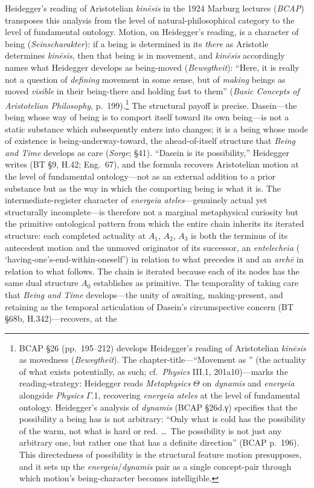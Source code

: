 Heidegger's reading of Aristotelian \textit{kinēsis} in the 1924 Marburg lectures (\textit{BCAP}) transposes this analysis from the level of natural-philosophical category to the level of fundamental ontology. Motion, on Heidegger's reading, is a character of being (\textit{Seinscharakter}): if a being is determined in its \textit{there} as Aristotle determines \textit{kinēsis}, then that being is in movement, and \textit{kinēsis} accordingly names what Heidegger develops as being-moved (\textit{Bewegtheit}): ``Here, it is really not a question of \textit{defining} movement in some sense, but of \textit{making} beings as moved \textit{visible} in their being-there and holding fast to them'' (\textit{Basic Concepts of Aristotelian Philosophy}, p.~199).\footnote{BCAP §26 (pp.~195--212) develops Heidegger's reading of Aristotelian \textit{kinēsis} as movedness (\textit{Bewegtheit}). The chapter-title---``Movement as '' (the actuality of what exists potentially, as such; cf.~\textit{Physics} III.1, 201a10)---marks the reading-strategy: Heidegger reads \textit{Metaphysics} $\Theta$ on \textit{dynamis} and \textit{energeia} alongside \textit{Physics} $\Gamma$.1, recovering \textit{energeia ateles} at the level of fundamental ontology. Heidegger's analysis of \textit{dynamis} (BCAP §26d.γ) specifies that the possibility a being has is not arbitrary: ``Only what is cold has the possibility of the warm, not what is hard or red. \ldots\ The possibility is not just any arbitrary one, but rather one that has a definite direction'' (BCAP p.~196). This directedness of possibility is the structural feature motion presupposes, and it sets up the \textit{energeia}/\textit{dynamis} pair as a single concept-pair through which motion's being-character becomes intelligible.} The structural payoff is precise. Dasein---the being whose way of being is to comport itself toward its own being---is not a static substance which subsequently enters into changes; it is a being whose mode of existence is being-underway-toward, the ahead-of-itself structure that \textit{Being and Time} develops as care (\textit{Sorge}; \S 41). ``Dasein is its possibility,'' Heidegger writes (BT \S 9, H.42; Eng.~67), and the formula recovers Aristotelian motion at the level of fundamental ontology---not as an external addition to a prior substance but as the way in which the comporting being is what it is. The intermediate-register character of \textit{energeia ateles}---genuinely actual yet structurally incomplete---is therefore not a marginal metaphysical curiosity but the primitive ontological pattern from which the entire chain inherits its iterated structure: each completed actuality at $A_1$, $A_2$, $A_3$ is both the terminus of its antecedent motion and the unmoved originator of its successor, an \textit{entelecheia} ( `having-one's-end-within-oneself') in relation to what precedes it and an \textit{archē} in relation to what follows. The chain is iterated because each of its nodes has the same dual structure $A_0$ establishes as primitive. The temporality of taking care that \textit{Being and Time} develops---the unity of awaiting, making-present, and retaining as the temporal articulation of Dasein's circumspective concern (BT \S 68b, H.342)---recovers, at the 